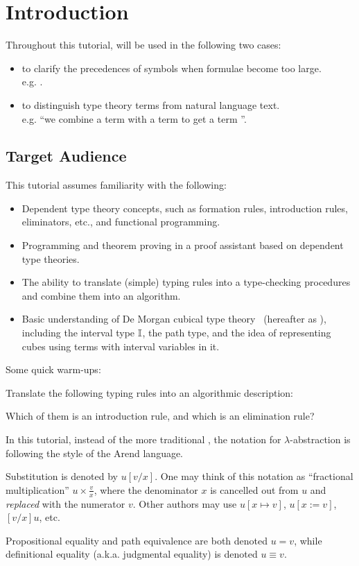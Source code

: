 \section{Introduction}
Throughout this tutorial,  will be used in the following two cases:
\begin{itemize}
\item to clarify the precedences of symbols when formulae become too large. \\
e.g. .
\item to distinguish type theory terms from natural language text. \\
e.g. ``we combine a term  with a term  to get a term ''.
\end{itemize}
\subsection{Target Audience}
This tutorial assumes familiarity with the following:
\begin{itemize}
\item Dependent type theory concepts, such as formation rules,
introduction rules, eliminators, etc., and functional programming.
\item Programming and theorem proving in a proof assistant based on dependent type theories.
\item The ability to translate (simple) typing rules into a type-checking procedures
and combine them into an algorithm.
\item Basic understanding of De Morgan cubical type theory~\cite{CCHM,CHM}
(hereafter as \CTT{}), including the interval type $\mathbb{I}$, the path type,
and the idea of representing cubes using terms with interval variables in it.
\end{itemize}
Some quick warm-ups:
\begin{exercise}
Translate the following typing rules into an algorithmic description:
Which of them is an introduction rule, and which is an elimination rule?
\end{exercise}
\begin{notation}
In this tutorial, instead of the more traditional ,
the notation for $\lambda$-abstraction is  
following the style of the Arend language.

Substitution is denoted by $u[v/x]$.
One may think of this notation as ``fractional multiplication'' $u\times \frac v x$,
where the denominator $x$ is cancelled out from $u$ and \textit{replaced} with the numerator $v$.
Other authors may use $u[x\mapsto v]$, $u[x:=v]$, $[v/x]u$, etc.

Propositional equality and path equivalence are both denoted $u=v$,
while definitional equality (a.k.a. judgmental equality) is denoted $u\equiv v$.
\end{notation}
